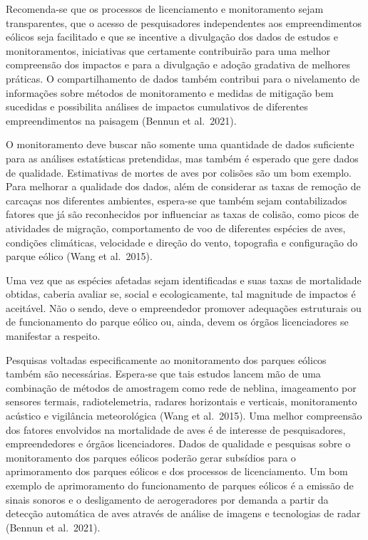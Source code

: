 \documentclass[
  oneside]{scrbook}
\begin{document}
Recomenda-se que os processos de licenciamento e monitoramento sejam transparentes, que o acesso de pesquisadores independentes aos empreendimentos eólicos seja facilitado e que se incentive a divulgação dos dados de estudos e monitoramentos, iniciativas que certamente contribuirão para uma melhor compreensão dos impactos e para a divulgação e adoção gradativa de melhores práticas. O compartilhamento de dados também contribui para o nivelamento de informações sobre métodos de monitoramento e medidas de mitigação bem sucedidas e possibilita análises de impactos cumulativos de diferentes empreendimentos na paisagem (Bennun et al.~2021).

O monitoramento deve buscar não somente uma quantidade de dados suficiente para as análises estatísticas pretendidas, mas também é esperado que gere dados de qualidade. Estimativas de mortes de aves por colisões são um bom exemplo. Para melhorar a qualidade dos dados, além de considerar as taxas de remoção de carcaças nos diferentes ambientes, espera-se que também sejam contabilizados fatores que já são reconhecidos por influenciar as taxas de colisão, como picos de atividades de migração, comportamento de voo de diferentes espécies de aves, condições climáticas, velocidade e direção do vento, topografia e configuração do parque eólico (Wang et al.~2015).

Uma vez que as espécies afetadas sejam identificadas e suas taxas de mortalidade obtidas, caberia avaliar se, social e ecologicamente, tal magnitude de impactos é aceitável. Não o sendo, deve o empreendedor promover adequações estruturais ou de funcionamento do parque eólico ou, ainda, devem os órgãos licenciadores se manifestar a respeito.

Pesquisas voltadas especificamente ao monitoramento dos parques eólicos também são necessárias. Espera-se que tais estudos lancem mão de uma combinação de métodos de amostragem como rede de neblina, imageamento por sensores termais, radiotelemetria, radares horizontais e verticais, monitoramento acústico e vigilância meteorológica (Wang et al.~2015). Uma melhor compreensão dos fatores envolvidos na mortalidade de aves é de interesse de pesquisadores, empreendedores e órgãos licenciadores. Dados de qualidade e pesquisas sobre o monitoramento dos parques eólicos poderão gerar subsídios para o aprimoramento dos parques eólicos e dos processos de licenciamento. Um bom exemplo de aprimoramento do funcionamento de parques eólicos é a emissão de sinais sonoros e o desligamento de aerogeradores por demanda a partir da detecção automática de aves através de análise de imagens e tecnologias de radar (Bennun et al.~2021).
\end{document}
